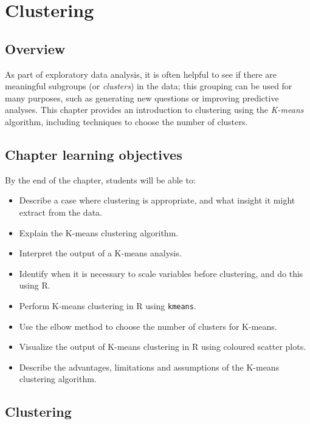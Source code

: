 \documentclass[
]{krantz}
\providecommand{\tightlist}{%
  \setlength{\itemsep}{0pt}\setlength{\parskip}{0pt}}
\begin{document}
\hypertarget{clustering}{%
\chapter{Clustering}\label{clustering}}

\hypertarget{overview-8}{%
\section{Overview}\label{overview-8}}

As part of exploratory data analysis, it is often helpful to see if there are
meaningful subgroups (or \emph{clusters}) in the data; this grouping can be used
for many purposes, such as generating new questions or improving predictive analyses.
This chapter provides an introduction to clustering using the \emph{K-means} algorithm,
including techniques to choose the number of clusters.

\hypertarget{chapter-learning-objectives-9}{%
\section{Chapter learning objectives}\label{chapter-learning-objectives-9}}

By the end of the chapter, students will be able to:

\begin{itemize}
\tightlist
\item
  Describe a case where clustering is appropriate, and what insight it might extract from the data.
\item
  Explain the K-means clustering algorithm.
\item
  Interpret the output of a K-means analysis.
\item
  Identify when it is necessary to scale variables before clustering, and do this using R.
\item
  Perform K-means clustering in R using \texttt{kmeans}.
\item
  Use the elbow method to choose the number of clusters for K-means.
\item
  Visualize the output of K-means clustering in R using coloured scatter plots.
\item
  Describe the advantages, limitations and assumptions of the K-means clustering algorithm.
\end{itemize}

\hypertarget{clustering-1}{%
\section{Clustering}\label{clustering-1}}
\end{document}
